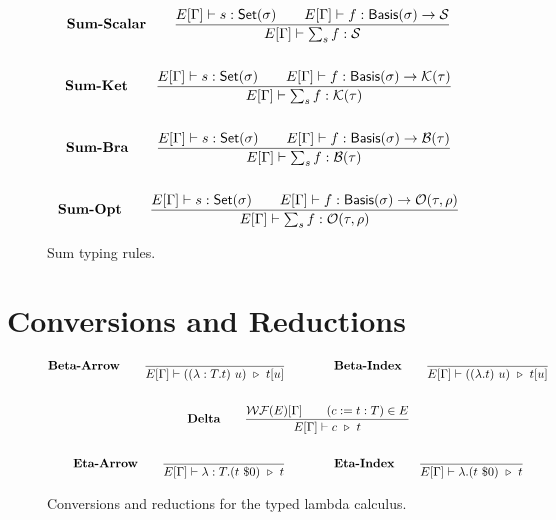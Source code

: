 \documentclass{article}
\begin{document}
\begin{figure}[h]
    \begin{gather*}
        \textbf{Sum-Scalar} \qquad
        \frac{E[\Gamma] \vdash s : \mathsf{Set}(\sigma) \qquad E[\Gamma] \vdash f : \mathsf{Basis}(\sigma) \to \mathcal{S}}{E[\Gamma] \vdash \sum_{s} f : \mathcal{S}} \\
        \\
        \textbf{Sum-Ket} \qquad
        \frac{E[\Gamma] \vdash s : \mathsf{Set}(\sigma) \qquad E[\Gamma] \vdash f : \mathsf{Basis}(\sigma) \to \mathcal{K}(\tau)}{E[\Gamma] \vdash \sum_{s} f : \mathcal{K}(\tau)} \\
        \\
        \textbf{Sum-Bra} \qquad
        \frac{E[\Gamma] \vdash s : \mathsf{Set}(\sigma) \qquad E[\Gamma] \vdash f : \mathsf{Basis}(\sigma) \to \mathcal{B}(\tau)}{E[\Gamma] \vdash \sum_{s} f : \mathcal{B}(\tau)} \\
        \\
        \textbf{Sum-Opt} \qquad
        \frac{E[\Gamma] \vdash s : \mathsf{Set}(\sigma) \qquad E[\Gamma] \vdash f : \mathsf{Basis}(\sigma) \to \mathcal{O}(\tau, \rho)}{E[\Gamma] \vdash \sum_{s} f : \mathcal{O}(\tau, \rho)}
    \end{gather*}
    \caption{Sum typing rules.}
\end{figure}

\clearpage
\section{Conversions and Reductions}
\begin{figure}[h]
    \begin{gather*}
        \textbf{Beta-Arrow} \qquad
        \frac{}{E[\Gamma] \vdash ((\lambda : T.t)\ u)\ \reduce\ t[u]} 
        \qquad \qquad
        \textbf{Beta-Index} \qquad
        \frac{}{E[\Gamma] \vdash ((\lambda.t)\ u)\ \reduce\ t[u]} 
        \\
        \\
        \textbf{Delta} \qquad
        \frac{\WF(E)[\Gamma] \qquad (c:=t:T) \in E}{E[\Gamma] \vdash c\ \reduce\ t} \\
        \\
        \textbf{Eta-Arrow} \qquad
        \frac{}{E[\Gamma] \vdash \lambda : T . (t\ \$0)\ \reduce\ t}
        \qquad \qquad
        \textbf{Eta-Index} \qquad
        \frac{}{E[\Gamma] \vdash \lambda . (t\ \$0)\ \reduce\ t}
    \end{gather*}
    \caption{Conversions and reductions for the typed lambda calculus.}
\end{figure}
\end{document}
